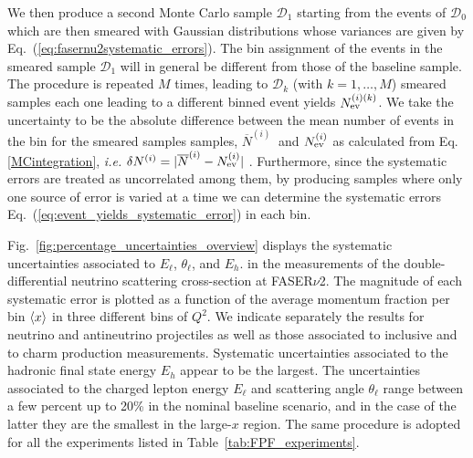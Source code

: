 We then produce a second Monte Carlo sample $\mathcal{D}_1$ starting from the events
of $\mathcal{D}_0$ which are then smeared with Gaussian distributions whose variances
are given by Eq.~(\ref{eq:fasernu2systematic_errors}).
%
The bin assignment of the events in the smeared sample $\mathcal{D}_1$ will
in general be different from those of the baseline sample.
%
The procedure is repeated $M$ times, leading to
$\mathcal{D}_k$ (with $k=1,\ldots,M$) smeared
samples each one leading to a different binned event yields
$ N_{\rm ev}^{(i)(k)}$.
%
We take the uncertainty to be the absolute difference between the mean number of events in the bin for the smeared samples samples, ${\overline{N}}^{(i)}~$ and$~ N_{\rm ev}^{(i)}$ as calculated from Eq. \ref{MCintegration}, {\it{i.e.}}  $\delta N^{(i)} = |{\overline{N}}^{(i)} -N_{\rm ev}^{(i)}|$ .
%
Furthermore, 
since the systematic errors are treated as uncorrelated among them,
by producing samples where only one source of error is varied at a time
we can determine the systematic errors Eq.~(\ref{eq:event_yields_systematic_error}) in each bin.

Fig.~\ref{fig:percentage_uncertainties_overview}
displays the systematic uncertainties associated
to $E_\ell$, $\theta_\ell$, and $E_h$.
in the  measurements
of the double-differential
neutrino scattering cross-section at FASER$\nu$2.
%
The magnitude of each systematic error is plotted as a function
of the average momentum fraction per bin $\left\langle x\right\rangle$
in three different bins of $Q^2$.
%
We indicate separately the results for neutrino and antineutrino projectiles as well as
those associated to inclusive and to charm production measurements.
%
Systematic uncertainties associated to the hadronic final state energy $E_h$ appear to be the largest.
%
The uncertainties associated to the charged lepton energy $E_\ell$ and scattering angle $\theta_\ell$ range
between a few percent up to 20\% in the nominal baseline scenario,
and in the case of the latter they are the smallest in the large-$x$ region.
%
The same procedure is adopted for all the experiments listed in Table~\ref{tab:FPF_experiments}.

